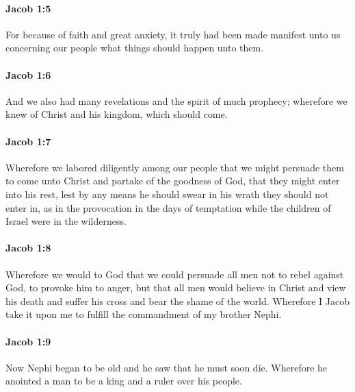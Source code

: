 		\paragraph{Jacob 1:5} %
			\label{JACOB-1-5}

			For because of faith and great anxiety,
			it truly had been made manifest unto us concerning our people
			what things should happen unto them.

		\paragraph{Jacob 1:6} %
			\label{JACOB-1-6}

			And we also had many revelations and the spirit of much prophecy;
			wherefore we knew of Christ and his kingdom, which should come.

		\paragraph{Jacob 1:7} %
			\label{JACOB-1-7}

			Wherefore we labored diligently among our people
			that we might persuade them to come unto Christ
			and partake of the goodness of God,
			that they might enter into his rest,
			lest by any means he should swear in his wrath they should not enter in,
			as in the provocation in the days of temptation
			while the children of Israel were in the wilderness.

		\paragraph{Jacob 1:8} %
			\label{JACOB-1-8}

			Wherefore we would to God that we could persuade all men
			not to rebel against God, to provoke him to anger,
			but that all men would believe in Christ
			and view his death and suffer his cross and bear the shame of the world.
			Wherefore I Jacob take it upon me to fulfill the commandment of my brother Nephi.

		\paragraph{Jacob 1:9} %
			\label{JACOB-1-9}

			Now Nephi began to be old and he saw that he must soon die.
			Wherefore he anointed a man to be a king and a ruler over his people.


